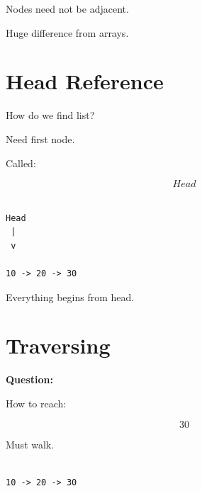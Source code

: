 \documentclass[11pt,a4paper]{book}
\begin{document}

Nodes need not be adjacent.


Huge difference from arrays.


\section{Head Reference}

How do we find list?


Need first node.


Called:

\[
Head
\]


\begin{verbatim}

Head
 |
 v

10 -> 20 -> 30

\end{verbatim}


Everything begins from head.


\section{Traversing}

\textbf{\textbf{Question:}}

How to reach:

\[
30
\]


Must walk.


\begin{verbatim}

10 -> 20 -> 30

\end{verbatim}
\end{document}
